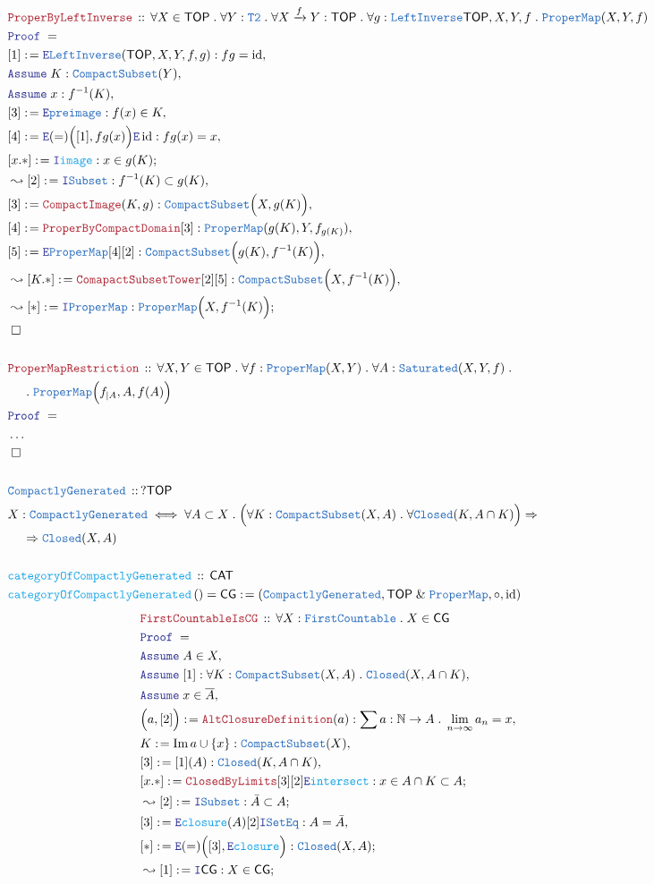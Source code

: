 \documentclass[12pt]{scrartcl}
\newcommand{\TYPE}[1]{\textcolor{NavyBlue}{\mathtt{#1}}}
\newcommand{\FUNC}[1]{\textcolor{Cerulean}{\mathtt{#1}}}
\newcommand{\LOGIC}[1]{\textcolor{Blue}{\mathtt{#1}}}
\newcommand{\THM}[1]{\textcolor{Maroon}{\mathtt{#1}}}
\renewcommand{\.}{\; . \;}
\newcommand{\de}{: \kern 0.1pc =}
\newcommand{\Act}[1]{\left( #1 \right)}
\newcommand{\Theorem}[2]{& \THM{#1} \, :: \, #2 \\ & \Proof = \\ }
\newcommand{\DeclareType}[2]{& \TYPE{#1} \, :: \, #2 \\}
\newcommand{\DefineType}[3]{& #1 : \TYPE{#2} \iff #3 \\}
\newcommand{\DeclareFunc}[2]{& \FUNC{#1} \, :: \, #2 \\}
\newcommand{\DefineNamedFunc}[4]{&  \FUNC{#1}\Act{#2} = #3 \de #4 \\}
\newcommand{\NewLine}{\\ & \kern 1pc}
\newcommand{\Page}[1]{ \begin{align*} #1 \end{align*}   }
\newcommand{\NoProof}{ & \ldots \\ \EndProof}
\renewcommand{\And}{\; \& \;}
\newcommand{\Imply}{\Rightarrow}
\newcommand{\Intro}{\LOGIC{I}}
\newcommand{\Elim}{\LOGIC{E}}
\newcommand{\Nat}{\mathbb{N} }
\DeclareMathOperator*{\id}{id}
\DeclareMathOperator*{\im}{Im}
\newcommand{\Arrow}{\xrightarrow}
\newcommand{\Say}[3]{& #1 \de #2 : #3, \\}
\newcommand{\Conclude}[3]{& #1 \de #2 : #3; \\}
\newcommand{\Derive}[3]{& \leadsto #1 \de #2 : #3, \\}
\newcommand{\DeriveConclude}[3]{& \leadsto #1 \de #2 : #3 ; \\}
\newcommand{\Assume}[2]{& \LOGIC{Assume} \; #1 : #2, \\}
\newcommand{\AssumeIn}[2]{& \LOGIC{Assume} \; #1 \in #2, \\}
\newcommand{\QED}{\; \square}
\newcommand{\EndProof}{& \QED \\}
\newcommand{\Proof}{\LOGIC{Proof} \; }
\newcommand{\CAT}{\mathsf{CAT}}
\newcommand{\TOP}{\mathsf{TOP}}
\newcommand{\CG}{\mathsf{CG}}
\begin{document}
\Page{
	\Theorem{ProperByLeftInverse}
	{
		\forall X \in \TOP \.
		\forall Y : \TYPE{T2} \.
		\forall X \Arrow{f} Y : \TOP \.
		\forall g : \TYPE{LeftInverse}{\TOP,X,Y,f} \.
		\TYPE{ProperMap}(X,Y,f)
	}
	\Say{[1]}{\Elim \TYPE{LeftInverse}(\TOP,X,Y,f,g)}
	{
		fg = \id
	}
	\Assume{K}{\TYPE{CompactSubset}(Y)}
	\Assume{x}{f^{-1}(K)}
	\Say{[3]}{\Elim \TYPE{preimage}}
	{
		f(x) \in K
	}
	\Say{[4]}{\Elim(=)\Big([1], fg(x) \Big) \Elim \id }{  fg(x) = x }
	\Conclude{[x.*]}{\Intro \FUNC{image}}{x \in g(K)}
	\Derive{[2]}{\Intro \TYPE{Subset}}{f^{-1}(K) \subset g(K)}
	\Say{[3]}{\THM{CompactImage}(K,g)}{\TYPE{CompactSubset}\Big( X, g(K) \Big)}
	\Say{[4]}{\THM{ProperByCompactDomain}[3]}
	{
		\TYPE{ProperMap}(g(K),Y,f_{g(K)})
	}
	\Say{[5]}{\Elim \TYPE{ProperMap}[4][2]}
	{
		\TYPE{CompactSubset}\Big( g(K), f^{-1}(K)  \Big)
	}
	\Derive{[K.*]}{\THM{ComapactSubsetTower}[2][5]}
	{
		\TYPE{CompactSubset}\Big( X, f^{-1}(K) \Big)
	}
	\DeriveConclude{[*]}{\Intro \TYPE{ProperMap}}
	{
		\TYPE{ProperMap}\Big( X, f^{-1}(K) \Big)
	}
	\EndProof
	\\
	\Theorem{ProperMapRestriction}
	{
		\forall X,Y \in \TOP \.
		\forall f : \TYPE{ProperMap}(X,Y) \.
		\forall A : \TYPE{Saturated}(X,Y,f) \. \NewLine \. 
		\TYPE{ProperMap}\Big(f_{|A}, A,f(A) \Big)
	}
	\NoProof
	\\
	\DeclareType{CompactlyGenerated}
	{?\TOP}
	\DefineType{X}{CompactlyGenerated}
	{
		\forall A \subset X \. 
		\Big(
			\forall K : \TYPE{CompactSubset}(X,A) \.
			\forall \TYPE{Closed}(K,A \cap K)
		\Big) 
		\Imply \NewLine
		\Imply \TYPE{Closed}(X,A)
	}
	\\
	\DeclareFunc{categoryOfCompactlyGenerated}{\CAT}
	\DefineNamedFunc{categoryOfCompactlyGenerated}{}{\CG}
	{
		(\TYPE{CompactlyGenerated}, \TOP \And \TYPE{ProperMap}, \circ, \id )
	}
}\Page{
	\Theorem{FirstCountableIsCG}
	{
		\forall X : \TYPE{FirstCountable} \. X \in \CG
	}
	\AssumeIn{A}{X}
	\Assume{[1]}{\forall K : \TYPE{CompactSubset}(X,A) \. \TYPE{Closed}(X, A \cap K) }
	\AssumeIn{x}{\overline{A}}
	\Say{\Big( a, [2] \Big)}{\THM{AltClosureDefinition}(a)}
	{
		\sum a : \Nat \to A \. \lim_{n \to \infty} a_n	= x
	}
	\Say{K}{\im a \cup \{x\}}{\TYPE{CompactSubset}(X)}
	\Say{[3]}{[1](A)}{ \TYPE{Closed}(K,A \cap K)  }
	\Conclude{[x.*]}{\THM{ClosedByLimits} [3][2] \Elim \FUNC{intersect}}
	{
		x \in A \cap K \subset A	
	}
	\DeriveConclude{[2]}{\Intro \TYPE{Subset}}
	{
		\bar A \subset A
	}
	\Say{[3]}{\Elim \FUNC{closure}(A) [2]\Intro \TYPE{SetEq}}
	{ A = \bar A }
	\Conclude{[*]}{\Elim(=)\Big( [3], \Elim \FUNC{closure}\Big)}
	{
		\TYPE{Closed}(X,A)
	}
	\DeriveConclude{[1]}{\Intro \CG}{X \in \CG}
}
\end{document}
